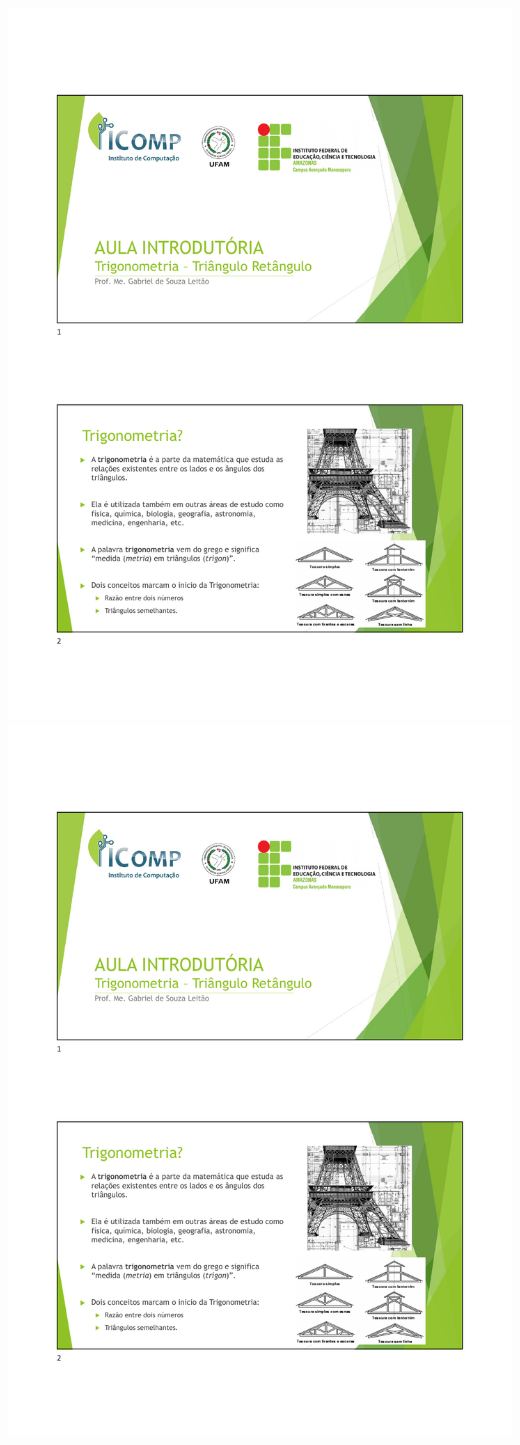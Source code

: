 \includegraphics[width=\textwidth,page=6]{chapters/appendixLesson/Aula1Base20220611.pdf}
\includegraphics[width=\textwidth,page=7]{chapters/appendixLesson/Aula1Base20220611.pdf}